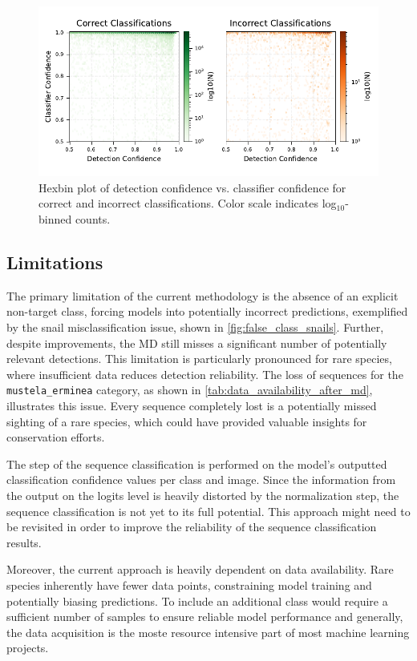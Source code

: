 \begin{figure}[ht]
\centering
\includegraphics{figures/pred_conf_hexbin.pdf}
\caption{Hexbin plot of detection confidence vs. classifier confidence for correct and incorrect classifications. Color scale indicates log$_{10}$-binned counts.}
\label{fig:pred_conf_hexbin}
\end{figure}

\subsection{Limitations}
The primary limitation of the current methodology is the absence of an explicit non-target class, forcing models into potentially incorrect predictions, exemplified by the snail misclassification issue, shown in \autoref{fig:false_class_snails}.
Further, despite improvements, the \ac{MD} still misses a significant number of potentially relevant detections.
This limitation is particularly pronounced for rare species, where insufficient data reduces detection reliability.
The loss of sequences for the \texttt{mustela\_erminea} category, as shown in \autoref{tab:data_availability_after_md}, illustrates this issue.
Every sequence completely lost is a potentially missed sighting of a rare species, which could have provided valuable insights for conservation efforts.

The step of the sequence classification is performed on the model's outputted classification confidence values per class and image.
Since the information from the output on the logits level is heavily distorted by the normalization step, the sequence classification is not yet to its full potential.
This approach might need to be revisited in order to improve the reliability of the sequence classification results.

Moreover, the current approach is heavily dependent on data availability.
Rare species inherently have fewer data points, constraining model training and potentially biasing predictions.
To include an additional class would require a sufficient number of samples to ensure reliable model performance and generally, the data acquisition is the moste resource intensive part of most machine learning projects.
